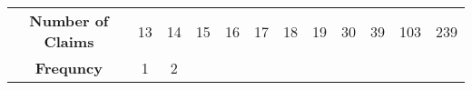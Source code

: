 \documentclass[]{book}
\theoremstyle{definition}
\theoremstyle{definition}
\theoremstyle{definition}
\theoremstyle{remark}
\begin{document}
\begin{longtable}[]{@{}cccccccccccc@{}}
\toprule
\begin{minipage}[t]{0.20\columnwidth}\centering\strut
\textbf{Number of Claims}\strut
\end{minipage} & \begin{minipage}[t]{0.04\columnwidth}\centering\strut
13\strut
\end{minipage} & \begin{minipage}[t]{0.04\columnwidth}\centering\strut
14\strut
\end{minipage} & \begin{minipage}[t]{0.04\columnwidth}\centering\strut
15\strut
\end{minipage} & \begin{minipage}[t]{0.04\columnwidth}\centering\strut
16\strut
\end{minipage} & \begin{minipage}[t]{0.04\columnwidth}\centering\strut
17\strut
\end{minipage} & \begin{minipage}[t]{0.04\columnwidth}\centering\strut
18\strut
\end{minipage} & \begin{minipage}[t]{0.04\columnwidth}\centering\strut
19\strut
\end{minipage} & \begin{minipage}[t]{0.04\columnwidth}\centering\strut
30\strut
\end{minipage} & \begin{minipage}[t]{0.04\columnwidth}\centering\strut
39\strut
\end{minipage} & \begin{minipage}[t]{0.05\columnwidth}\centering\strut
103\strut
\end{minipage} & \begin{minipage}[t]{0.05\columnwidth}\centering\strut
239\strut
\end{minipage}\tabularnewline
\begin{minipage}[t]{0.20\columnwidth}\centering\strut
\textbf{Frequncy}\strut
\end{minipage} & \begin{minipage}[t]{0.04\columnwidth}\centering\strut
1\strut
\end{minipage} & \begin{minipage}[t]{0.04\columnwidth}\centering\strut
2\strut
\end{minipage} & \begin{minipage}[t]{0.04\columnwidth}\centering\strut

\end{minipage}
\end{longtable}
\end{document}
